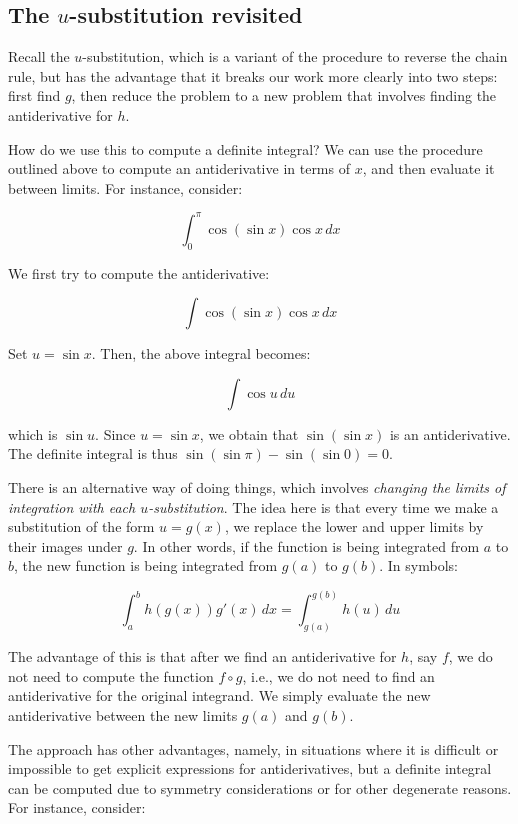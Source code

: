 \documentclass{amsart}
\begin{document}
\subsection{The $u$-substitution revisited}

Recall the $u$-substitution, which is a variant of the procedure to
reverse the chain rule, but has the advantage that it breaks our work
more clearly into two steps: first find $g$, then reduce the problem
to a new problem that involves finding the antiderivative for $h$.

How do we use this to compute a definite integral? We can use the
procedure outlined above to compute an antiderivative in terms of $x$,
and then evaluate it between limits. For instance, consider:

$$\int_0^\pi \cos(\sin x) \cos x \, dx$$

We first try to compute the antiderivative:

$$\int \cos (\sin x) \cos x \, dx$$

Set $u = \sin x$. Then, the above integral becomes:

$$\int \cos u \, du$$

which is $\sin u$. Since $u = \sin x$, we obtain that $\sin(\sin x)$
is an antiderivative. The definite integral is thus $\sin(\sin \pi) -
\sin(\sin 0) = 0$.

There is an alternative way of doing things, which involves {\em
changing the limits of integration with each $u$-substitution}. The
idea here is that every time we make a substitution of the form $u =
g(x)$, we replace the lower and upper limits by their images under
$g$. In other words, if the function is being integrated from $a$ to
$b$, the new function is being integrated from $g(a)$ to $g(b)$. In
symbols:

$$\int_a^b h(g(x))g'(x) \, dx = \int_{g(a)}^{g(b)} h(u) \, du$$

The advantage of this is that after we find an antiderivative for $h$,
say $f$, we do not need to compute the function $f \circ g$, i.e., we
do not need to find an antiderivative for the original integrand. We
simply evaluate the new antiderivative between the new limits $g(a)$
and $g(b)$.

The approach has other advantages, namely, in situations where it is
difficult or impossible to get explicit expressions for
antiderivatives, but a definite integral can be computed due to
symmetry considerations or for other degenerate reasons. For instance,
consider:
\end{document}
